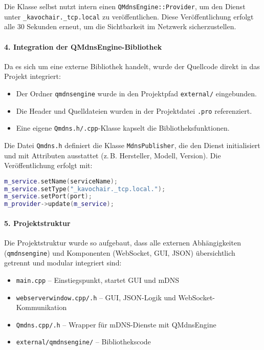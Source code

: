 Die Klasse selbst nutzt intern einen \texttt{QMdnsEngine::Provider}, um den Dienst unter \texttt{\_kavochair.\_tcp.local} zu veröffentlichen. Diese Veröffentlichung erfolgt alle 30 Sekunden erneut, um die Sichtbarkeit im Netzwerk sicherzustellen.

\vspace{1em}
\paragraph{4. Integration der QMdnsEngine-Bibliothek}

Da es sich um eine externe Bibliothek handelt, wurde der Quellcode direkt in das Projekt integriert:

\begin{itemize}
  \item Der Ordner \texttt{qmdnsengine} wurde in den Projektpfad \texttt{external/} eingebunden.
  \item Die Header und Quelldateien wurden in der Projektdatei \texttt{.pro} referenziert.
  \item Eine eigene \texttt{Qmdns.h/.cpp}-Klasse kapselt die Bibliotheksfunktionen.
\end{itemize}

Die Datei \texttt{Qmdns.h} definiert die Klasse \texttt{MdnsPublisher}, die den Dienst initialisiert und mit Attributen ausstattet (z.\,B. Hersteller, Modell, Version). Die Veröffentlichung erfolgt mit:

\begin{lstlisting}[language=C++,caption={QMdnsEngine: Dienstkonfiguration},label={lst:qmdns-config}]
m_service.setName(serviceName);
m_service.setType("_kavochair._tcp.local.");
m_service.setPort(port);
m_provider->update(m_service);
\end{lstlisting}

\vspace{1em}
\paragraph{5. Projektstruktur}

Die Projektstruktur wurde so aufgebaut, dass alle externen Abhängigkeiten (\texttt{qmdnsengine}) und Komponenten (WebSocket, GUI, JSON) übersichtlich getrennt und modular integriert sind:

\begin{itemize}
    \item \texttt{main.cpp} – Einstiegspunkt, startet GUI und mDNS
    \item \texttt{webserverwindow.cpp/.h} – GUI, JSON-Logik und WebSocket-Kommunikation
    \item \texttt{Qmdns.cpp/.h} – Wrapper für mDNS-Dienste mit QMdnsEngine
    \item \texttt{external/qmdnsengine/} – Bibliothekscode
\end{itemize}

